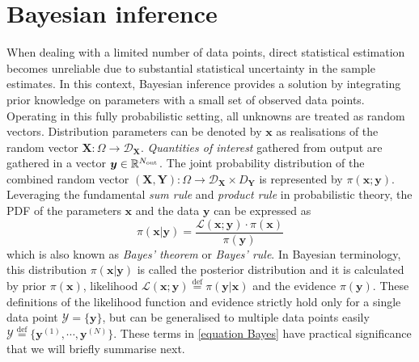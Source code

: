 \section{Bayesian inference}

When dealing with a limited number of data points, direct statistical estimation becomes unreliable due to substantial statistical uncertainty in the sample estimates. In this context, Bayesian inference provides a solution by integrating prior knowledge on parameters with a small set of observed data points. Operating in this fully probabilistic setting, all unknowns are treated as random vectors. Distribution parameters can be denoted by $\boldsymbol{x}$ as realisations of the random vector $\boldsymbol{X}:\Omega \rightarrow \mathcal{D}_{\boldsymbol{X}}$. \textit{Quantities of interest} gathered from output are gathered in a vector $\boldsymbol{y} \in \mathbb{R}^{N_{\rm{out}}}$. The joint probability distribution of the combined random vector $(\boldsymbol{X},\boldsymbol{Y}):\Omega \rightarrow \mathcal{D}_{\boldsymbol{X}} \times {D}_{\boldsymbol{Y}}$ is represented by $\pi(\boldsymbol{x};\boldsymbol{y})$. Leveraging the fundamental \textit{sum rule} and \textit{product rule} in probabilistic theory, the \acrfull{PDF} of the parameters $\boldsymbol{x}$ and the data $\boldsymbol{y}$ can be expressed as
\begin{equation}
\pi(\boldsymbol{x}|\boldsymbol{y}) = \frac{{\mathcal{L}(\boldsymbol{x};\boldsymbol{y}) \cdot \pi(\boldsymbol{x})}}{{\pi(\boldsymbol{y})}} \label{equation Bayes}
\end{equation}
which is also known as \textit{Bayes' theorem} or \textit{Bayes' rule}. In Bayesian terminology, this distribution $\pi(\boldsymbol{x}|\boldsymbol{y})$ is called the posterior distribution and it is calculated by prior $\pi(\boldsymbol{x})$, likelihood $\mathcal{L}(\boldsymbol{x};\boldsymbol{y})\stackrel{\mathrm{def}}{=}\pi(\boldsymbol{y}|\boldsymbol{x})$
and the evidence $\pi(\boldsymbol{y})$. These definitions of the likelihood function and evidence strictly hold only for a single data point $\mathcal{Y}=\{\boldsymbol{y} \}$, but can be generalised to multiple data points easily $\mathcal{Y} \stackrel{\mathrm{def}}{=} \{{\boldsymbol{y}^{(1)}},\cdots,{\boldsymbol{y}^{(N)}}\}$. These terms in \cref{equation Bayes} have practical significance that we will briefly summarise next.
